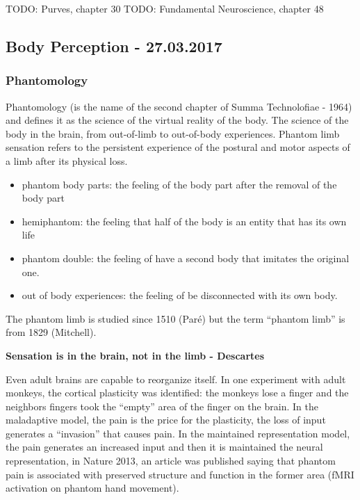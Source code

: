 \documentclass[12pt,article,oneside,a4paper]{memoir}
\begin{document}
TODO: Purves, chapter 30
TODO: Fundamental Neuroscience, chapter 48

\newpage
\subsection{Body Perception - 27.03.2017}
\subsubsection{Phantomology}
Phantomology (is the name of the second chapter of Summa Technolofiae - 1964) and defines it as the science of the virtual reality of the body.
The science of the body in the brain, from out-of-limb to out-of-body experiences. 
Phantom  limb  sensation refers to the persistent experience of the postural and motor aspects of a limb after its physical loss.
\begin{itemize}
\item phantom body parts: the feeling of the body part after the removal of the body part
\item hemiphantom: the feeling that half of the body is an entity that has its own life
\item phantom double: the feeling of have a second body that imitates the original one.
\item out of body experiences: the feeling of be disconnected with its own body.
\end{itemize}

The phantom limb is studied since 1510 (Paré) but the term ``phantom limb'' is from 1829 (Mitchell).

\textbf{Sensation is in the brain, not in the limb - Descartes}

Even adult brains are capable to reorganize itself. In one experiment with adult monkeys, the cortical plasticity was identified: the monkeys lose a finger and the neighbors fingers took the ``empty'' area of the finger on the brain.
In the maladaptive model, the pain is the price for the plasticity, the loss of input generates a ``invasion'' that causes pain. 
In the maintained representation model, the pain generates an increased input and then it is maintained the neural representation, in Nature 2013, an article was published saying that phantom pain is associated with preserved structure and function in the former area (fMRI activation on phantom hand movement).
\end{document}

